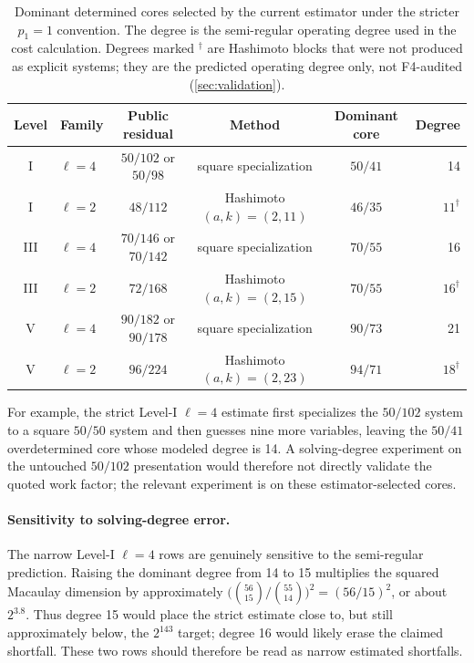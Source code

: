 \documentclass[runningheads]{llncs}
\begin{document}
\begin{table}[t]
\centering
\caption{Dominant determined cores selected by the current estimator under the
stricter $p_1=1$ convention.  The degree is the semi-regular operating degree
used in the cost calculation.  Degrees marked $^\dagger$ are Hashimoto blocks
that were not produced as explicit systems; they are the predicted operating
degree only, not F4-audited (\cref{sec:validation}).}
\label{tab:actual-cores}
\small
\setlength{\tabcolsep}{4pt}
\begin{tabular}{@{}c l c c c r@{}}
\toprule
Level & Family & Public residual & Method & Dominant core & Degree\\
\midrule
I   & $\ell=4$ & $50/102$ or $50/98$ & square specialization & $50/41$ & 14\\
I   & $\ell=2$ & $48/112$ & Hashimoto $(a,k)=(2,11)$ & $46/35$ & $11^\dagger$\\
III & $\ell=4$ & $70/146$ or $70/142$ & square specialization & $70/55$ & 16\\
III & $\ell=2$ & $72/168$ & Hashimoto $(a,k)=(2,15)$ & $70/55$ & $16^\dagger$\\
V   & $\ell=4$ & $90/182$ or $90/178$ & square specialization & $90/73$ & 21\\
V   & $\ell=2$ & $96/224$ & Hashimoto $(a,k)=(2,23)$ & $94/71$ & $18^\dagger$\\
\bottomrule
\end{tabular}
\end{table}

For example, the strict Level-I $\ell=4$ estimate first specializes the $50/102$
system to a square $50/50$ system and then guesses nine more variables, leaving
the $50/41$ overdetermined core whose modeled degree is 14.  A solving-degree
experiment on the untouched $50/102$ presentation would therefore not directly
validate the quoted work factor; the relevant experiment is on these
estimator-selected cores.

\paragraph{Sensitivity to solving-degree error.}
The narrow Level-I $\ell=4$ rows are genuinely sensitive to the semi-regular
prediction.  Raising the dominant degree from 14 to 15 multiplies the squared
Macaulay dimension by approximately $\bigl(\binom{56}{15}/\binom{55}{14}\bigr)^2
=(56/15)^2$, or about $2^{3.8}$.  Thus degree 15 would place the strict estimate
close to, but still approximately below, the $2^{143}$ target; degree 16 would
likely erase the claimed shortfall.  These two rows should therefore be read as
narrow estimated shortfalls.
\end{document}
